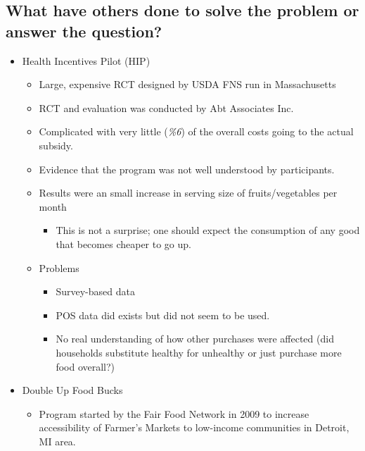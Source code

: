 \documentclass[11pt,letterpaper,]{book}
\providecommand{\tightlist}{%
  \setlength{\itemsep}{0pt}\setlength{\parskip}{0pt}}
\begin{document}
\subsection{What have others done to solve the problem or answer the
question?}\label{what-have-others-done-to-solve-the-problem-or-answer-the-question}

\begin{itemize}
\tightlist
\item
  Health Incentives Pilot (HIP)

  \begin{itemize}
  \tightlist
  \item
    Large, expensive RCT designed by USDA FNS run in Massachusetts
  \item
    RCT and evaluation was conducted by Abt Associates Inc.
  \item
    Complicated with very little (\emph{\%6}) of the overall costs going
    to the actual subsidy.
  \item
    Evidence that the program was not well understood by participants.
  \item
    Results were an small increase in serving size of fruits/vegetables
    per month

    \begin{itemize}
    \tightlist
    \item
      This is not a surprise; one should expect the consumption of any
      good that becomes cheaper to go up.
    \end{itemize}
  \item
    Problems

    \begin{itemize}
    \tightlist
    \item
      Survey-based data
    \item
      POS data did exists but did not seem to be used.
    \item
      No real understanding of how other purchases were affected (did
      households substitute healthy for unhealthy or just purchase more
      food overall?)
    \end{itemize}
  \end{itemize}
\item
  Double Up Food Bucks

  \begin{itemize}
  \tightlist
  \item
    Program started by the Fair Food Network in 2009 to increase
    accessibility of Farmer's Markets to low-income communities in
    Detroit, MI area.


\end{itemize}
\end{itemize}
\end{document}
